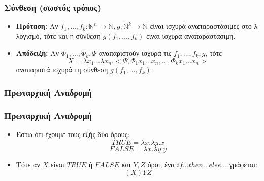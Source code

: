 \documentclass{beamer}
\begin{document}
\begin{frame}
        \frametitle{Σύνθεση (σωστός τρόπος)}
        \begin{itemize}
                \item \textbf{Πρόταση:} Αν $f_1,\ldots,f_k : \mathbb{N}^n \rightarrow \mathbb{N}, g : \mathbb{N}^k \rightarrow \mathbb{N}$ είναι ισχυρά αναπαραστάσιμες στο λ-λογισμό, τότε και η σύνθεση 
                 $g(f_1,\ldots,f_k)$ είναι ισχυρά αναπαραστάσιμη. \pause
                 \item \textbf{Απόδειξη:} Αν $\Phi_1, \ldots, \Phi_k, \Psi$ αναπαριστούν ισχυρά τις
                  $f_1,\ldots, f_k, g$, τότε
                  $$X = \lambda x_1 \ldots \lambda x_n . <\Psi, \Phi_1 x_1 \ldots x_n, \ldots, \Phi_k x_1 \ldots x_n> $$
                  αναπαριστά ισχυρά τη σύνθεση $g(f_1,\ldots,f_k)$. 
        \end{itemize}
\end{frame}

\subsubsection{Πρωταρχική Αναδρομή}

\begin{frame}
        \frametitle{Πρωταρχική Αναδρομή}
        \begin{itemize}
                \item Έστω ότι έχουμε τους εξής δύο όρους:
                $$ TRUE = \lambda x. \lambda y. x $$
                $$ FALSE = \lambda x. \lambda y. y $$
                \pause
                \item Τότε αν $X$ είναι $TRUE$ ή $FALSE$ και $Y,Z$ όροι, ένα $if\ldots then \ldots else \ldots$ γράφεται:
                $$ (X)YZ $$
        \end{itemize}
\end{frame}
\end{document}
